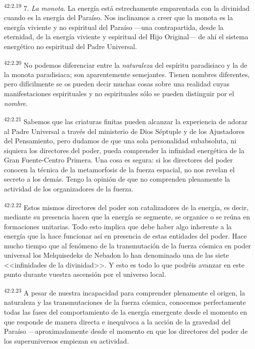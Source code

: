 \par
\textsuperscript{42:2.19} 7. \textit{La monota}. La energía está estrechamente emparentada con la divinidad cuando es la energía del Paraíso. Nos inclinamos a creer que la monota es la energía viviente y no espiritual del Paraíso ---una contrapartida, desde la eternidad, de la energía viviente y espiritual del Hijo Original--- de ahí el sistema energético no espiritual del Padre Universal.

\par
\textsuperscript{42:2.20} No podemos diferenciar entre la \textit{naturaleza} del espíritu paradisiaco y la de la monota paradisiaca; son aparentemente semejantes. Tienen nombres diferentes, pero difícilmente se os pueden decir muchas cosas sobre una realidad cuyas manifestaciones espirituales y no espirituales sólo se pueden distinguir por el \textit{nombre}.

\par
\textsuperscript{42:2.21} Sabemos que las criaturas finitas pueden alcanzar la experiencia de adorar al Padre Universal a través del ministerio de Dios Séptuple y de los Ajustadores del Pensamiento, pero dudamos de que una sola personalidad subabsoluta, ni siquiera los directores del poder, pueda comprender la infinidad energética de la Gran Fuente-Centro Primera. Una cosa es segura: si los directores del poder conocen la técnica de la metamorfosis de la fuerza espacial, no nos revelan el secreto a los demás. Tengo la opinión de que no comprenden plenamente la actividad de los organizadores de la fuerza.

\par
\textsuperscript{42:2.22} Estos mismos directores del poder son catalizadores de la energía, es decir, mediante su presencia hacen que la energía se segmente, se organice o se reúna en formaciones unitarias. Todo esto implica que debe haber algo inherente a la energía que la hace funcionar así en presencia de estas entidades del poder. Hace mucho tiempo que al fenómeno de la transmutación de la fuerza cósmica en poder universal los Melquisedeks de Nebadon lo han denominado una de las siete <<infinidades de la divinidad>>. Y esto es todo lo que podréis avanzar en este punto durante vuestra ascensión por el universo local.

\par
\textsuperscript{42:2.23} A pesar de nuestra incapacidad para comprender plenamente el origen, la naturaleza y las transmutaciones de la fuerza cósmica, conocemos perfectamente todas las fases del comportamiento de la energía emergente desde el momento en que responde de manera directa e inequívoca a la acción de la gravedad del Paraíso ---aproximadamente desde el momento en que los directores del poder de los superuniversos empiezan su actividad.

